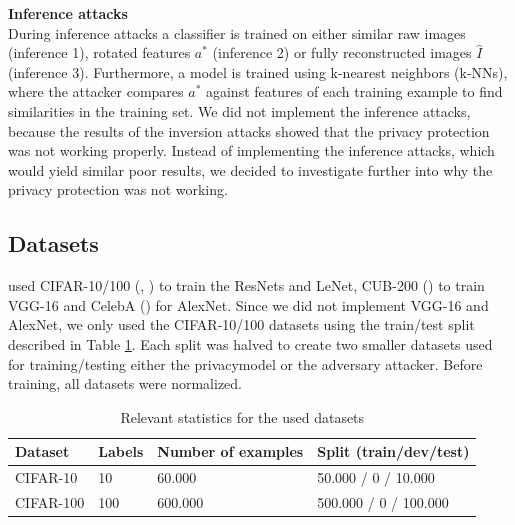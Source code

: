 

\textbf{Inference attacks}\\
During inference attacks a classifier is trained on either similar raw images (inference 1), rotated features $a^*$ (inference 2) or fully reconstructed images $\hat{I}$ (inference 3). Furthermore, a model is trained using k-nearest neighbors (k-NNs), where the attacker compares $a^*$ against features of each training example to find similarities in the training set. We did not implement the inference attacks, because the results of the inversion attacks showed that the privacy protection was not working properly. Instead of implementing the inference attacks, which would yield similar poor results, we decided to investigate further into why the privacy protection was not working.


\subsection{Datasets}

\cite{xiang2020interpretable} used CIFAR-10/100 (\cite{cifar10}, \cite{cifar100}) to train the ResNets and LeNet, CUB-200 (\cite{WelinderEtal2010}) to train VGG-16 and CelebA (\cite{CelebA}) for AlexNet. Since we did not implement VGG-16 and AlexNet, we only used the CIFAR-10/100 datasets using the train/test split described in Table \ref{dataset}. Each split was halved to create two smaller datasets used for training/testing either the privacymodel or the adversary attacker. Before training, all datasets were normalized. 

\begin{table}[t]
    \centering
    \setlength{\abovecaptionskip}{5pt}
    \caption{Relevant statistics for the used datasets}
    \begin{tabular}{l||l|l|l}
    \hline
    \textbf{Dataset} & \textbf{Labels} & \textbf{Number of examples} & \textbf{Split (train/dev/test)} \\
    \hline 
    CIFAR-10 & 10 & 60.000 & 50.000 / 0 / 10.000 \\
    CIFAR-100 & 100 & 600.000 & 500.000 / 0 / 100.000 \\
    \end{tabular}
    \label{dataset}
\end{table}

